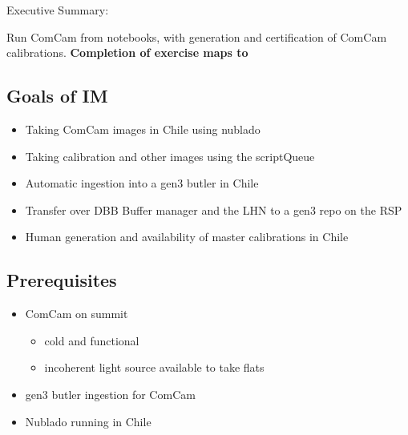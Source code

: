 
Executive Summary:

Run ComCam from notebooks, with generation and certification of ComCam calibrations.
\textbf{Completion of exercise maps to }

\subsection{Goals of IM}

\begin{itemize}
	\item Taking ComCam images in Chile using nublado
              \textbf{}
	\item Taking calibration and other images using the \gls{scriptQueue}
	\item Automatic ingestion into a gen3 butler in Chile
              \textbf{}
	\item Transfer over \gls{DBB Buffer manager} and the \gls{LHN} to a gen3 repo on the \gls{RSP}
	\item Human generation and availability of master calibrations in Chile
\end{itemize}

\subsection{Prerequisites}
\begin{itemize}
	\item{ComCam on summit}
	\begin{itemize}
		\item cold and functional
		\item incoherent light source available to take flats
	\end{itemize}
	\item{gen3 butler ingestion for ComCam}
\item{Nublado running in Chile}
\end{itemize}


